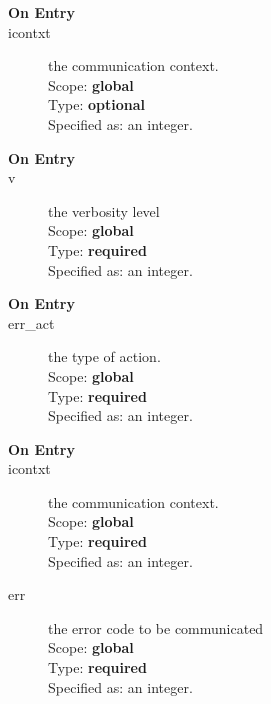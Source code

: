 

\begin{description}
\item[\bf On Entry]
\item[icontxt] the communication context.\\
Scope: {\bf global} \\
Type: {\bf optional}\\
Specified as: an integer.
\end{description}





\begin{description}
\item[\bf On Entry]
\item[v] the verbosity level\\
Scope: {\bf global}\\
Type: {\bf required}\\
Specified as: an integer.
\end{description}



\begin{description}
\item[\bf On Entry]
\item[err\_act] the type of action.\\
Scope: {\bf global} \\
Type: {\bf required}\\
Specified as: an integer.
\end{description}





\begin{description}
\item[\bf On Entry]
\item[icontxt] the communication context.\\
Scope: {\bf global} \\
Type: {\bf required}\\
Specified as: an integer.
\item[err] the error code to be communicated\\
Scope: {\bf global} \\
Type: {\bf required}\\
Specified as: an integer.\\
\end{description}


